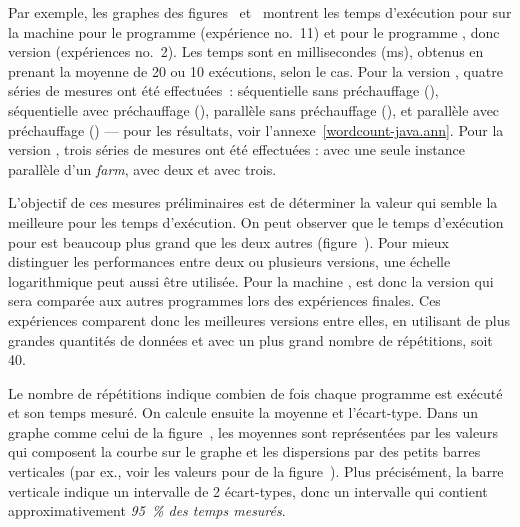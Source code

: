 Par exemple, les graphes des figures~ et~ montrent les temps d'ex\'ecution pour  sur la machine  pour le programme  (expérience no.~11) et pour le programme , donc version  (expériences no.~2). Les temps sont en millisecondes (ms), obtenus en prenant la moyenne de 20 ou 10 ex\'ecutions, selon le cas.
%
Pour la version , quatre séries de mesures ont été
effectuées~: séquentielle sans préchauffage (), séquentielle
avec préchauffage (), parallèle sans préchauffage
(), et parallèle avec préchauffage () --- pour les résultats, voir l'annexe~\ref{wordcount-java.ann}.
%
Pour la version \ppff, trois  s\'eries de mesures ont \'et\'e effectu\'ees :  avec une seule instance parallèle d'un \emph{farm},  avec deux et  avec trois.



L'objectif de ces mesures pr\'eliminaires est de d\'eterminer la valeur qui semble la meilleure pour les temps d'ex\'ecution. On peut observer que le temps d'ex\'ecution pour  est beaucoup plus grand que les deux autres (figure~).
%
Pour mieux distinguer les performances entre deux ou plusieurs versions, une échelle logarithmique peut aussi être utilis\'ee. 
%
Pour la machine ,  est donc la version qui sera compar\'ee aux autres programmes lors des expériences finales. Ces expériences comparent donc les meilleures versions entre elles, en utilisant de plus grandes quantit\'es de donn\'ees et avec un plus grand nombre de r\'ep\'etitions, soit 40.


Le nombre de r\'ep\'etitions indique combien de fois chaque programme est exécuté et son temps mesuré.
%
On calcule ensuite la moyenne et l'écart-type. Dans un graphe comme celui de la figure~, les moyennes sont repr\'esent\'ees par les valeurs qui composent la courbe sur le graphe et les dispersions par des petits barres verticales (par ex., voir les valeurs pour 
de la figure~). Plus précisément, la barre verticale indique un intervalle de 2 écart-types, donc un intervalle qui contient approximativement \emph{95~\% des temps mesurés}.



